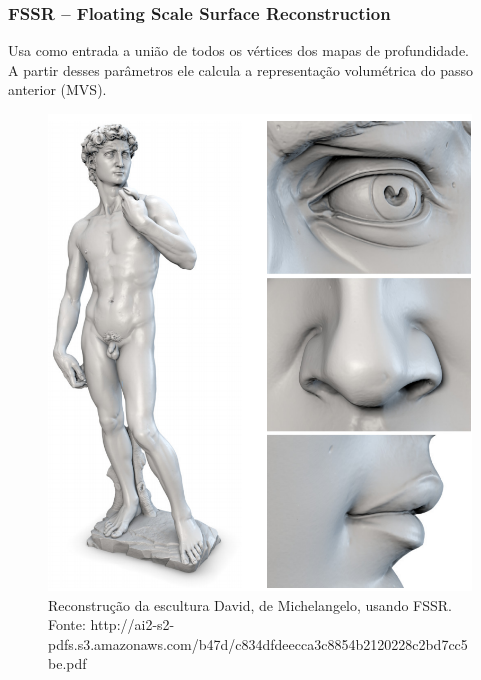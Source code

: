 \documentclass[table, usenames, svgnames, xcolor=dvipsnames]{beamer}
\begin{document}
\begin{frame}
\frametitle{\textbf{FSSR -- Floating Scale Surface Reconstruction}}
	\begin{center}
	Usa como entrada a união de todos os vértices dos mapas de profundidade. \\
	A partir desses parâmetros ele calcula a representação volumétrica do passo anterior (MVS).
	\end{center}
\end{frame}

\begin{frame}

		\begin{figure}
			\centering
			\includegraphics[width=0.8\linewidth]{figs/michFSSR.png}
			\caption{
			Reconstrução da escultura David, de Michelangelo, usando FSSR. \\
			\tiny{Fonte: http://ai2-s2-pdfs.s3.amazonaws.com/b47d/c834dfdeecca3c8854b2120228c2bd7cc5be.pdf}
			}
		\end{figure}

\end{frame}
\end{document}
